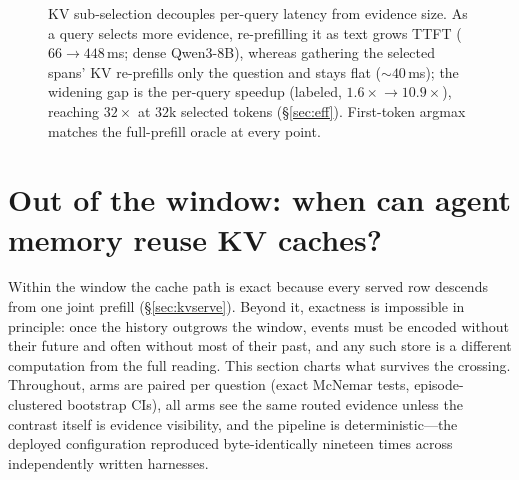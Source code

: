 \documentclass{article} %
\begin{document}
\begin{figure}[t]
\centering
{}
\caption{KV sub-selection decouples per-query latency from evidence size. As a query
selects more evidence, re-prefilling it as text grows TTFT ($66\!\to\!448$\,ms;
dense Qwen3-8B), whereas gathering the selected spans' KV re-prefills only the
question and stays flat ($\sim\!40$\,ms); the widening gap is the per-query speedup
(labeled, $1.6\times\!\to\!10.9\times$), reaching $32\times$ at $32$k selected tokens
(\S\ref{sec:eff}). First-token argmax matches the full-prefill oracle at every point.}
\label{fig:eff}
\end{figure}

\section{Out of the window: when can agent memory reuse {KV} caches?}
\label{sec:oow}

Within the window the cache path is exact because every served row descends from one joint
prefill (\S\ref{sec:kvserve}). Beyond it, exactness is impossible in principle: once the
history outgrows the window, events must be encoded without their future and often without
most of their past, and any such store is a different computation from the full reading.
This section charts what survives the crossing. Throughout, arms are paired per question
(exact McNemar tests, episode-clustered bootstrap CIs), all arms see the same routed
evidence unless the contrast itself is evidence visibility, and the pipeline is
deterministic---the deployed configuration reproduced byte-identically nineteen times across
independently written harnesses.
\end{document}
